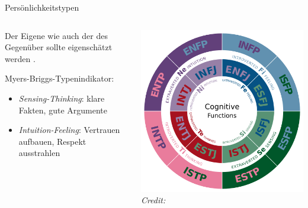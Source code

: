 \begin{frame}{Persönlichkeitstypen}
  \begin{columns}[c]
    \begin{column}{.55\textwidth}
     Der Eigene wie auch der des Gegenüber sollte eigenschätzt werden
        \cite[][ch. 4.5.5]{helmold_verhandlungskonzepte_2019}.

      Myers-Briggs-Typenindikator:
      \begin{itemize}
        \item \textit{Sensing-Thinking}: klare Fakten, gute Argumente
        \item \textit{Intuition-Feeling}: Vertrauen aufbauen, Respekt ausstrahlen
      \end{itemize}
    \end{column}
    \begin{column}{.35\textwidth}
      \includegraphics[width=\textwidth]{content/fig/mbti.png}
      {\hspace*{15pt}\hbox{\scriptsize\itshape Credit:}}
    \end{column}

\end{columns}

    
\end{frame}


